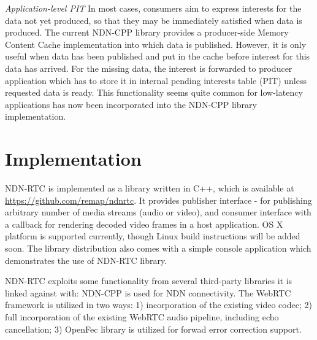 \documentclass{icn/sig-alternate-2012} %
\newcommand{\ndnrtcName}{NDN-RTC} %
\begin{document}









\textit{Application-level PIT} In most cases, consumers aim to express interests for the data not yet produced, so that they may be immediately satisfied when data is produced. The current NDN-CPP library provides a producer-side Memory Content Cache implementation into which data is published. However, it is only useful when data has been published and put in the cache before interest for this data has arrived. For the missing data, the interest is forwarded to producer application which has to store it in internal pending interests table (PIT) unless requested data is ready. This functionality seems quite common for low-latency applications has now been incorporated into the NDN-CPP library implementation.

\section{Implementation}
\label{sec:imp}
\ndnrtcName{} is implemented as a library written in C++, which is available at \url{https://github.com/remap/ndnrtc}. 
It provides publisher interface - for publishing arbitrary number of media streams (audio or video), and consumer interface with a callback for rendering decoded video frames in a host application. OS X platform is supported currently, though Linux build instructions will be added soon. 
The library distribution also comes with a simple console application which demonstrates the use of \ndnrtcName{} library.

\ndnrtcName{} exploits some functionality from several third-party libraries it is linked against with: NDN-CPP \cite{ndnccl} is used for NDN connectivity. The WebRTC framework \cite{webrtc} is utilized in two ways: 1) incorporation of the existing video codec; 2) full incorporation of the existing WebRTC audio pipeline, including echo cancellation;  3) OpenFec \cite{openfec} library is utilized for forwad error correction support.
\end{document}
